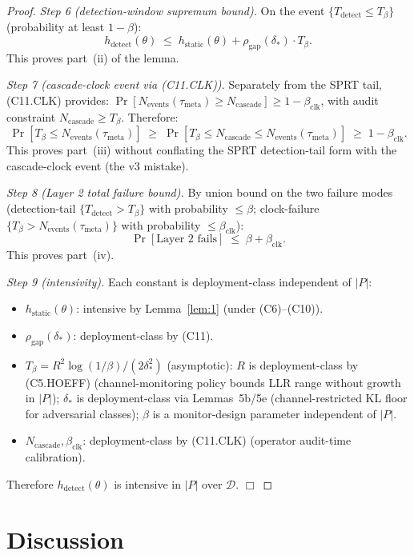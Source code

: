 \documentclass{article}
\newcommand{\deltastar}{\delta_{*}}
\newcommand{\rhogap}{\rho_{\mathrm{gap}}}
\newcommand{\Tbeta}{T_{\beta}}
\newcommand{\Ncasc}{N_{\mathrm{cascade}}}
\newcommand{\Nev}{N_{\mathrm{events}}}
\newcommand{\bclk}{\beta_{\mathrm{clk}}}
\begin{document}
\begin{proof}
\emph{Step 6 (detection-window supremum bound).}  On the event
$\{T_{\mathrm{detect}} \leq \Tbeta\}$ (probability at least
$1-\beta$):
\[
  h_{\mathrm{detect}}(\theta) \;\leq\;
  h_{\mathrm{static}}(\theta) + \rhogap(\deltastar) \cdot
  \Tbeta.
\]
This proves part~(ii) of the lemma.

\emph{Step 7 (cascade-clock event via (C11.CLK)).}  Separately
from the SPRT tail, (C11.CLK) provides:
$\Pr[\Nev(\tau_{\mathrm{meta}}) \geq \Ncasc] \geq 1 - \bclk$, with
audit constraint $\Ncasc \geq \Tbeta$.  Therefore:
\[
  \Pr[\Tbeta \leq \Nev(\tau_{\mathrm{meta}})] \;\geq\;
  \Pr[\Tbeta \leq \Ncasc \leq \Nev(\tau_{\mathrm{meta}})]
  \;\geq\; 1 - \bclk.
\]
This proves part~(iii) without conflating the SPRT detection-tail
form with the cascade-clock event (the v3 mistake).

\emph{Step 8 (Layer 2 total failure bound).}  By union bound on
the two failure modes (detection-tail $\{T_{\mathrm{detect}} >
\Tbeta\}$ with probability $\leq \beta$; clock-failure
$\{\Tbeta > \Nev(\tau_{\mathrm{meta}})\}$ with probability
$\leq \bclk$):
\[
  \Pr[\text{Layer~2 fails}] \;\leq\; \beta + \bclk.
\]
This proves part~(iv).

\emph{Step 9 (intensivity).}  Each constant is deployment-class
independent of $|P|$:
\begin{itemize}
\item $h_{\mathrm{static}}(\theta)$: intensive by Lemma~\ref{lem:1}
  (under (C6)--(C10)).
\item $\rhogap(\deltastar)$: deployment-class by (C11).
\item $\Tbeta = R^2 \log(1/\beta)/(2\deltastar^2)$ (asymptotic):
  $R$ is deployment-class by (C5.HOEFF) (channel-monitoring policy
  bounds LLR range without growth in $|P|$); $\deltastar$ is
  deployment-class via Lemmas~5b/5e (channel-restricted KL floor
  for adversarial classes); $\beta$ is a monitor-design parameter
  independent of $|P|$.
\item $\Ncasc, \bclk$: deployment-class by (C11.CLK) (operator
  audit-time calibration).
\end{itemize}
Therefore $h_{\mathrm{detect}}(\theta)$ is intensive in $|P|$ over
$\mathcal{D}$.  $\Box$
\end{proof}

\section{Discussion}
\end{document}
